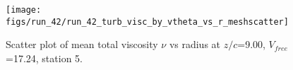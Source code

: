 \begin{figure}[H]
\centering
\texttt{[image: figs/run\_42/run\_42\_turb\_visc\_by\_vtheta\_vs\_r\_meshscatter]}
\caption{Scatter plot of mean total viscosity $\nu$ vs radius at $z/c$=9.00, $V_{free}$=17.24, station 5.}
\label{fig:run_42_turb_visc_by_vtheta_vs_r_meshscatter}
\end{figure}


